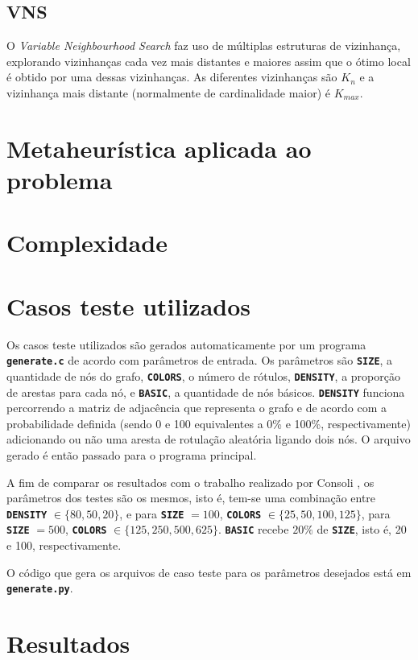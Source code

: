 \documentclass[12pt, a4paper]{article}
\newcommand{\ic}[1]{\textbf{\lstinline{#1}}}
\begin{document}
\subsection{VNS}
O \emph{Variable Neighbourhood Search} faz uso de múltiplas estruturas de
vizinhança, explorando vizinhanças cada vez mais distantes e maiores assim que
o ótimo local é obtido por uma dessas vizinhanças. As diferentes vizinhanças
são $ K_n $ e a vizinhança mais distante (normalmente de cardinalidade maior)
é $ K_{max} $.

\section{Metaheurística aplicada ao problema}

\section{Complexidade}

\section{Casos teste utilizados}
Os casos teste utilizados são gerados automaticamente por um programa
\ic{generate.c} de acordo com parâmetros de entrada. Os parâmetros são
\ic{SIZE}, a quantidade de nós do grafo, \ic{COLORS}, o número de rótulos,
\ic{DENSITY}, a proporção de arestas para cada nó, e \ic{BASIC}, a quantidade
de nós básicos. \ic{DENSITY} funciona percorrendo a matriz de adjacência que
representa o grafo e de acordo com a probabilidade definida (sendo 0 e 100
equivalentes a 0\% e 100\%, respectivamente) adicionando ou não uma aresta de
rotulação aleatória ligando dois nós. O arquivo gerado é então passado para o
programa principal.

A fim de comparar os resultados com o trabalho realizado por Consoli
\cite{consoli}, os parâmetros dos testes são os mesmos, isto é, tem-se uma
combinação entre \ic{DENSITY} $ \in \{80, 50, 20\} $, e para \ic{SIZE} $ = 100 $,
\ic{COLORS} $ \in \{25, 50, 100, 125\} $, para \ic{SIZE} $ = 500 $, \ic{COLORS}
$ \in \{125, 250, 500, 625\} $. \ic{BASIC} recebe $ 20\% $ de \ic{SIZE}, isto é,
20 e 100, respectivamente.

O código que gera os arquivos de caso teste para os parâmetros desejados está
em \ic{generate.py}.

\section{Resultados}
\end{document}
